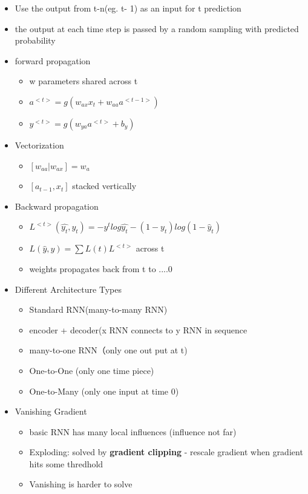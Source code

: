 \documentclass[11pt, openany]{book}              %
\begin{document}
\begin{itemize}
	\item Use the output from t-n(eg. t- 1) as an input for t prediction 
	\item the output at each time step is passed by a random sampling with predicted probability
	\item forward propagation
	\begin{itemize}
		\item w parameters shared across t
		\item $a^{<t>} = g(w_{ax} x_t + w_{aa} a^{<t-1>})$ 
		\item $y^{<t>} = g(w_{ya} a^{<t>} + b_y)$
	\end{itemize}
	\item Vectorization
	\begin{itemize}
    	\item $[w_{aa}| w_{ax}] = w_a$ 
    	\item $[a_{t-1}, x_t]$ stacked vertically
    \end{itemize}
	\item Backward propagation
	\begin{itemize}
  		\item $L^{<t>} (\hat{y_t},y_t) = - y^t log \hat{y_t} - (1-y_t) log(1-\hat{y}_t)$
  		\item $L(\hat{y},y) = \sum L(t) L^{<t>}$ across t
  		\item weights propagates back from t to ....0
  	\end{itemize}
	\item Different Architecture Types
	\begin{itemize}
  		\item Standard RNN(many-to-many RNN)
    	\item encoder + decoder(x RNN connects to y RNN in sequence
  		\item many-to-one RNN（only one out put at t)
  		\item One-to-One (only one time piece)
  		\item One-to-Many (only one input at time 0)
  	\end{itemize}
	\item Vanishing Gradient 
	\begin{itemize}
  		\item basic RNN has many local influences (influence not far)
  		\item Exploding: solved by \textbf{gradient clipping} - rescale gradient when gradient hits some thredhold
  		\item Vanishing is harder to solve
  	\end{itemize}
\end{itemize}
\end{document}
